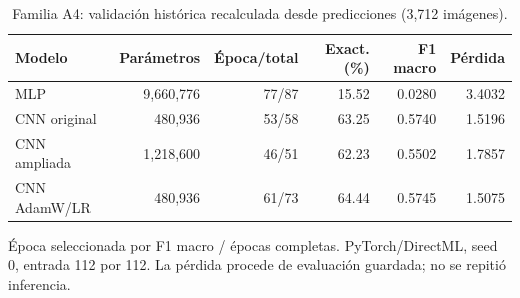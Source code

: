 \begin{table}[htbp]
\centering
\small
\caption{Familia A4: validación histórica recalculada desde predicciones (3,712 imágenes).}
\label{tab:modelos-a4}
\begin{tabular}{lrrrrr}
\toprule
Modelo & Parámetros & Época/total & Exact. (\%) & F1 macro & Pérdida \\
\midrule
MLP & 9,660,776 & 77/87 & 15.52 & 0.0280 & 3.4032 \\
CNN original & 480,936 & 53/58 & 63.25 & 0.5740 & 1.5196 \\
CNN ampliada & 1,218,600 & 46/51 & 62.23 & 0.5502 & 1.7857 \\
CNN AdamW/LR & 480,936 & 61/73 & 64.44 & 0.5745 & 1.5075 \\
\bottomrule
\end{tabular}
\par\smallskip
\parbox{0.97\textwidth}{\footnotesize Época seleccionada por F1 macro / épocas completas. PyTorch/DirectML, seed 0, entrada 112 por 112. La pérdida procede de evaluación guardada; no se repitió inferencia.}
\end{table}
